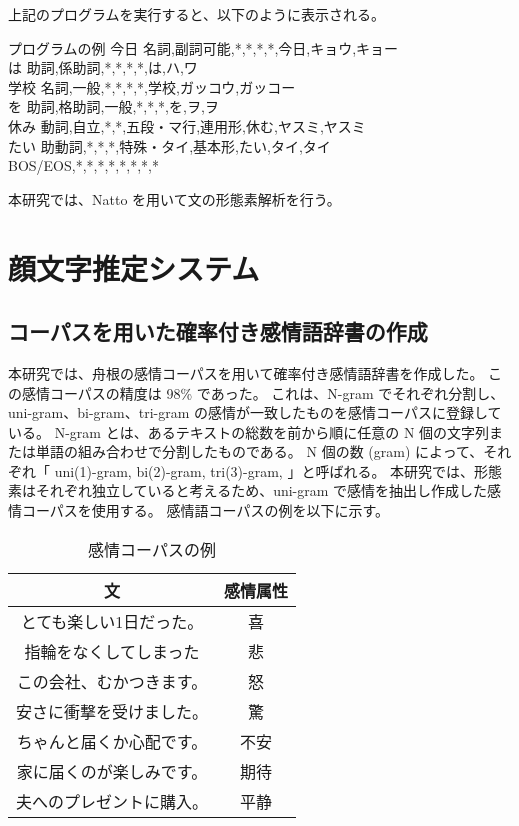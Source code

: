 \documentclass[11pt,a4j]{jsarticle}
\begin{document}
上記のプログラムを実行すると、以下のように表示される。

\begin{itembox}[l]{プログラムの例}
  今日  名詞,副詞可能,*,*,*,*,今日,キョウ,キョー \\
  は  助詞,係助詞,*,*,*,*,は,ハ,ワ\\ 
  学校  名詞,一般,*,*,*,*,学校,ガッコウ,ガッコー\\
  を  助詞,格助詞,一般,*,*,*,を,ヲ,ヲ\\
  休み  動詞,自立,*,*,五段・マ行,連用形,休む,ヤスミ,ヤスミ\\
  たい  助動詞,*,*,*,特殊・タイ,基本形,たい,タイ,タイ\\
 BOS/EOS,*,*,*,*,*,*,*,*\\
\end{itembox}

本研究では、Natto を用いて文の形態素解析を行う。

\section{顔文字推定システム}\label{sec:theorem}
  \subsection{コーパスを用いた確率付き感情語辞書の作成}\label{sec:tweetcorpus}
本研究では、舟根の感情コーパスを用いて確率付き感情語辞書を作成した。
この感情コーパスの精度は 98\% であった。
これは、N-gram でそれぞれ分割し、uni-gram、bi-gram、tri-gram の感情が一致したものを感情コーパスに登録している。
N-gram とは、あるテキストの総数を前から順に任意の N 個の文字列または単語の組み合わせで分割したものである。
N 個の数 (gram) によって、それぞれ「 uni(1)-gram, bi(2)-gram, tri(3)-gram, \cdots 」と呼ばれる。
本研究では、形態素はそれぞれ独立していると考えるため、uni-gram で感情を抽出し作成した感情コーパスを使用する。
感情語コーパスの例を以下に示す。

\begin{table}[htb]
  \caption{感情コーパスの例}
  \centering
  \begin{tabular}{c|c} \hline
    文 & 感情属性 \\ \hline \hline
    とても楽しい1日だった。 & 喜 \\
    指輪をなくしてしまった & 悲 \\
    この会社、むかつきます。 & 怒 \\ 
    安さに衝撃を受けました。 & 驚 \\
    ちゃんと届くか心配です。 & 不安 \\
    家に届くのが楽しみです。 & 期待 \\
    夫へのプレゼントに購入。& 平静 \\ \hline
  \end{tabular}
\end{table}
\end{document}
